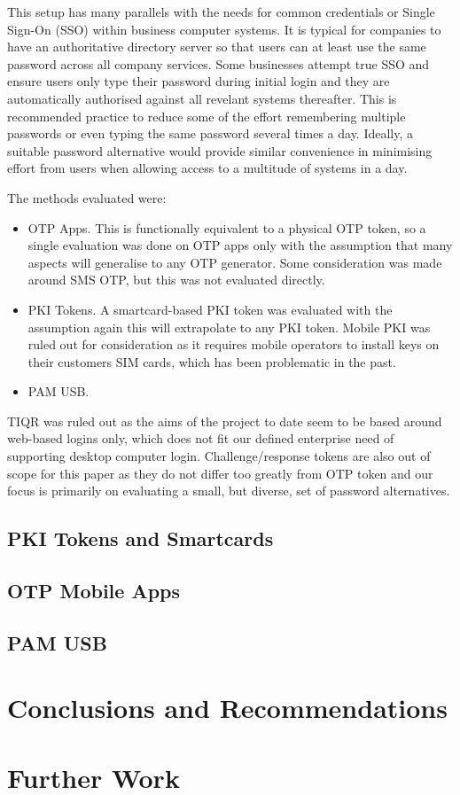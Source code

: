 \documentclass{report}
\begin{document}
This setup has many parallels with the needs for common credentials or
Single Sign-On (SSO) within business computer systems. It is typical for
companies to have an authoritative directory server so that users
can at least use the same password across all company services. Some businesses
attempt true SSO and ensure users only type their password during initial
login and they are automatically authorised against all revelant systems
thereafter. This is recommended practice to reduce some of the effort
remembering multiple passwords or even typing the same password several times
a day. Ideally, a suitable password alternative would provide similar
convenience in minimising effort from users when allowing access to a multitude
of systems in a day.

The methods evaluated were:

\begin{itemize}
  \item OTP Apps. This is functionally equivalent to a physical OTP token,
    so a single evaluation was done on OTP apps only with the assumption that
    many aspects will generalise to any OTP generator. Some consideration
    was made around SMS OTP, but this was not evaluated directly.
  \item PKI Tokens. A smartcard-based PKI token was evaluated with the
    assumption again this will extrapolate to any PKI token. Mobile PKI was
    ruled out for consideration as it requires mobile operators to install
    keys on their customers SIM cards, which has been problematic in the
    past.
  \item PAM USB.
\end{itemize}

TIQR was ruled out as the aims of the project to date seem to be based around
web-based logins only, which does not fit our defined enterprise need of
supporting desktop computer login. Challenge/response tokens are also
out of scope for this paper as they do not differ too greatly from OTP
token and our focus is primarily on evaluating a small, but diverse, set
of password alternatives.


\section{PKI Tokens and Smartcards}

\section{OTP Mobile Apps}

\section{PAM USB}

\chapter{Conclusions and Recommendations}

\chapter{Further Work}

\printbibliography
\end{document}
